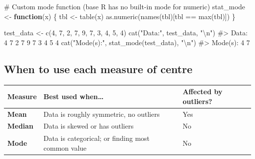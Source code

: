 \documentclass[
  11pt,
  a4paper,
  oneside,
  open=any]{scrbook}
\newenvironment{Shaded}{\begin{snugshade}}{\end{snugshade}}
\newcommand{\CommentTok}[1]{\textcolor[rgb]{0.37,0.37,0.37}{#1}}
\newcommand{\ControlFlowTok}[1]{\textcolor[rgb]{0.00,0.23,0.31}{\textbf{#1}}}
\newcommand{\DecValTok}[1]{\textcolor[rgb]{0.68,0.00,0.00}{#1}}
\newcommand{\FunctionTok}[1]{\textcolor[rgb]{0.28,0.35,0.67}{#1}}
\newcommand{\NormalTok}[1]{\textcolor[rgb]{0.00,0.23,0.31}{#1}}
\newcommand{\OtherTok}[1]{\textcolor[rgb]{0.00,0.23,0.31}{#1}}
\newcommand{\SpecialCharTok}[1]{\textcolor[rgb]{0.37,0.37,0.37}{#1}}
\newcommand{\StringTok}[1]{\textcolor[rgb]{0.13,0.47,0.30}{#1}}
\begin{document}
\begin{Shaded}
\begin{Highlighting}[]
\CommentTok{\# Custom mode function (base R has no built{-}in mode for numeric)}
\NormalTok{stat\_mode }\OtherTok{\textless{}{-}} \ControlFlowTok{function}\NormalTok{(x) \{}
\NormalTok{  tbl }\OtherTok{\textless{}{-}} \FunctionTok{table}\NormalTok{(x)}
  \FunctionTok{as.numeric}\NormalTok{(}\FunctionTok{names}\NormalTok{(tbl)[tbl }\SpecialCharTok{==} \FunctionTok{max}\NormalTok{(tbl)])}
\NormalTok{\}}

\NormalTok{test\_data }\OtherTok{\textless{}{-}} \FunctionTok{c}\NormalTok{(}\DecValTok{4}\NormalTok{, }\DecValTok{7}\NormalTok{, }\DecValTok{2}\NormalTok{, }\DecValTok{7}\NormalTok{, }\DecValTok{9}\NormalTok{, }\DecValTok{7}\NormalTok{, }\DecValTok{3}\NormalTok{, }\DecValTok{4}\NormalTok{, }\DecValTok{5}\NormalTok{, }\DecValTok{4}\NormalTok{)}
\FunctionTok{cat}\NormalTok{(}\StringTok{"Data:"}\NormalTok{, test\_data, }\StringTok{"}\SpecialCharTok{\textbackslash{}n}\StringTok{"}\NormalTok{)}
\CommentTok{\#\textgreater{} Data: 4 7 2 7 9 7 3 4 5 4}
\FunctionTok{cat}\NormalTok{(}\StringTok{"Mode(s):"}\NormalTok{, }\FunctionTok{stat\_mode}\NormalTok{(test\_data), }\StringTok{"}\SpecialCharTok{\textbackslash{}n}\StringTok{"}\NormalTok{)}
\CommentTok{\#\textgreater{} Mode(s): 4 7}
\end{Highlighting}
\end{Shaded}

\subsection{When to use each measure of
centre}\label{when-to-use-each-measure-of-centre}

\begin{longtable}[]{@{}lll@{}}
\toprule\noalign{}
Measure & Best used when\ldots{} & Affected by outliers? \\
\midrule\noalign{}
\endhead
\bottomrule\noalign{}
\endlastfoot
\textbf{Mean} & Data is roughly symmetric, no outliers & Yes \\
\textbf{Median} & Data is skewed or has outliers & No \\
\textbf{Mode} & Data is categorical; or finding most common value &
No \\
\end{longtable}
\end{document}
